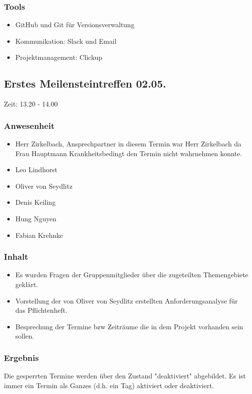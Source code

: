 \subsubsection{Tools}
\begin{itemize}
	\item GitHub und Git für Versionsverwaltung 
	\item Kommunikation: Slack und Email
	\item Projektmanagement: Clickup
\end{itemize}



\subsection{Erstes Meilensteintreffen 02.05.} 

Zeit: 13.20 - 14.00

\subsubsection{Anwesenheit}
\begin{itemize}
	\item Herr Zirkelbach, Ansprechpartner in diesem Termin war Herr Zirkelbach da Frau Hauptmann Krankheitsbedingt den Termin nicht wahrnehmen konnte.
	\item Leo Lindhorst
	\item Oliver von Seydlitz
	\item Denis Keiling
	\item Hung Nguyen
	\item Fabian Krehnke
\end{itemize}

\subsubsection{Inhalt}
\begin{itemize}
\item Es wurden Fragen der Gruppenmitglieder über die zugeteilten Themengebiete geklärt.
\item Vorstellung der von Oliver von Seydlitz erstellten Anforderungsanalyse für das Pflichtenheft. 
\item Besprechung der Termine bzw Zeiträume die in dem Projekt vorhanden sein sollen.
\end{itemize}

\subsubsection{Ergebnis}
Die gesperrten Termine werden über den Zustand "deaktiviert" abgebildet. Es ist immer ein Termin als Ganzes (d.h. ein Tag) aktiviert oder deaktiviert.


